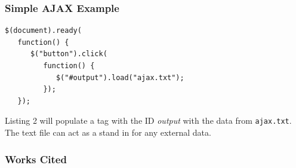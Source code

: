 \documentclass[aspectratio=169]{beamer}
\begin{document}
\begin{frame}[fragile]
\frametitle{Simple AJAX Example}
\begin{lstlisting}[caption=Simple AJAX Example]
$(document).ready(
   function() {
      $("button").click(
         function() {
            $("#output").load("ajax.txt");
         });
   });
\end{lstlisting}
Listing 2 will populate a tag with the ID \textit{output} with the data from \texttt{ajax.txt}. The text file can act as a stand in for any external data. \cite{jquery-ajax}
\end{frame}

\begin{frame}
\frametitle{Works Cited}

\end{frame}
\end{document}
